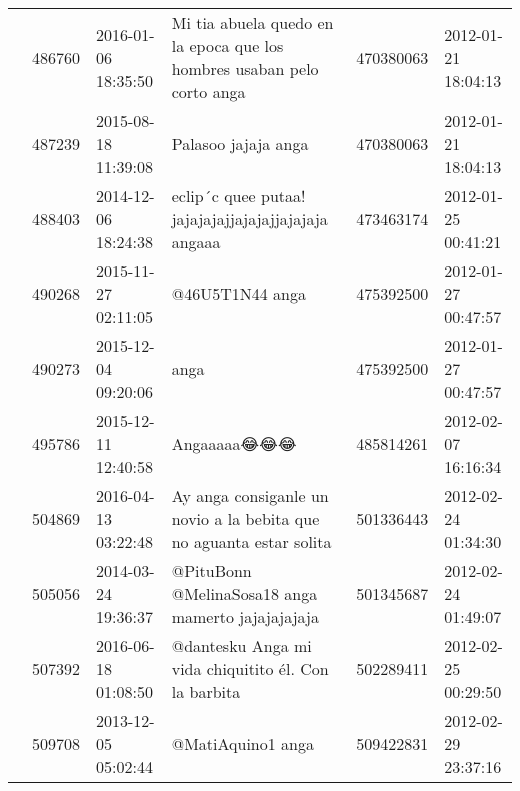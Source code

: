 \begin{tabular}{llllrl}
           & 486760  & 2016-01-06 18:35:50 &                                                                       Mi tia abuela quedo en la epoca que los hombres usaban pelo corto anga &   470380063 & 2012-01-21 18:04:13 \\
           & 487239  & 2015-08-18 11:39:08 &                                                                                                                          Palasoo jajaja anga &   470380063 & 2012-01-21 18:04:13 \\
           & 488403  & 2014-12-06 18:24:38 &                                                                                         eclip´c  quee putaa! jajajajajjajajajjajajaja angaaa &   473463174 & 2012-01-25 00:41:21 \\
           & 490268  & 2015-11-27 02:11:05 &                                                                                                                              @46U5T1N44 anga &   475392500 & 2012-01-27 00:47:57 \\
           & 490273  & 2015-12-04 09:20:06 &                                                                                                                                         anga &   475392500 & 2012-01-27 00:47:57 \\
           & 495786  & 2015-12-11 12:40:58 &                                                                                                                                  Angaaaaa😂😂😂 &   485814261 & 2012-02-07 16:16:34 \\
           & 504869  & 2016-04-13 03:22:48 &                                                                          Ay anga consiganle un novio a la bebita que no aguanta estar solita &   501336443 & 2012-02-24 01:34:30 \\
           & 505056  & 2014-03-24 19:36:37 &                                                                                            @PituBonn @MelinaSosa18 anga mamerto jajajajajaja &   501345687 & 2012-02-24 01:49:07 \\
           & 507392  & 2016-06-18 01:08:50 &                                                                                         @dantesku Anga mi vida chiquitito él. Con la barbita &   502289411 & 2012-02-25 00:29:50 \\
           & 509708  & 2013-12-05 05:02:44 &                                                                                                                            @MatiAquino1 anga &   509422831 & 2012-02-29 23:37:16 \\

\end{tabular}
